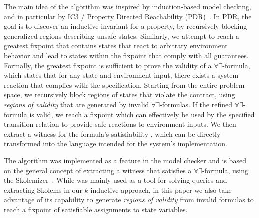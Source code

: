 The main idea of the algorithm was inspired by induction-based model checking, and in particular by IC3 / Property Directed Reachability (PDR)~\cite{bradley2011sat,een2011efficient}. In PDR, the goal is to discover an inductive invariant for a property, by recursively blocking generalized regions describing unsafe states. Similarly, we attempt
to reach a greatest fixpoint that contains states that react to arbitrary environment behavior and lead to states within the fixpoint that comply with all guarantees. Formally, the greatest fixpoint is sufficient to prove the validity of a $\forall\exists$-formula, which states that for any state and environment input, there exists a system reaction that complies with the specification. Starting from the entire
problem space, we recursively block regions of states that violate the contract, using \textit{regions of validity} that are
generated by invalid $\forall\exists$-formulas.
If the refined
$\forall\exists$-formula is valid, we reach a fixpoint which can effectively be used by the specified transition relation to
provide safe reactions to environment inputs. We then extract a witness for the
formula's satisfiability%
, which can be directly transformed into the
language intended for the system's implementation.

The algorithm was implemented as a feature in the \jkind model checker and is based on the general
concept of extracting a witness that satisfies a $\forall\exists$-formula, using
the \aeval Skolemizer~\cite{fedyukovich2015automated,KatisFGBGW16}. While \aeval was mainly used as a tool for solving queries and extracting Skolems in our $k$-inductive approach, in this paper we also take advantage of its capability to generate
\textit{regions of validity} from invalid formulas to reach a fixpoint of satisfiable assignments to state variables.

